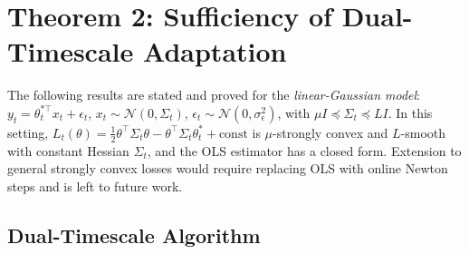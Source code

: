 \section{Theorem 2: Sufficiency of Dual-Timescale Adaptation}
\label{sec:theorem2}

\begin{remark}
\label{rem:thm2-scope}
The following results are stated and proved for the
\emph{linear-Gaussian model}: $y_t = \theta^{*\top}_t x_t + \epsilon_t$,
$x_t \sim \mathcal{N}(0, \Sigma_t)$, $\epsilon_t \sim \mathcal{N}(0,
\sigma_\epsilon^2)$, with $\mu I \preceq \Sigma_t \preceq LI$.
In this setting, $L_t(\theta) = \frac{1}{2}\theta^\top\Sigma_t\theta
- \theta^\top \Sigma_t\theta^*_t + \text{const}$ is $\mu$-strongly convex
and $L$-smooth with constant Hessian $\Sigma_t$, and the OLS estimator
has a closed form. Extension to general strongly convex losses would
require replacing OLS with online Newton steps and is left to future work.
\end{remark}

\subsection{Dual-Timescale Algorithm}

